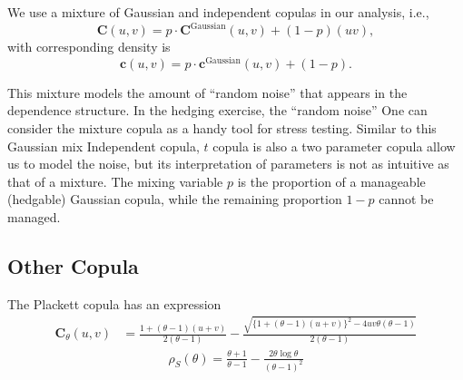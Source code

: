 We use a mixture of Gaussian and independent copulas in our analysis,
i.e., 
\begin{equation*}
  \bm{C}(u,v) = p\cdot \bm{C}^\text{Gaussian}(u,v) + (1-p)(uv),
\end{equation*}
with corresponding density is
\begin{equation*}
  \bm{c}(u,v) = p\cdot \bm{c}^\text{Gaussian}(u,v) + (1-p).
\end{equation*}

This mixture models the amount of ``random noise'' that appears in the
dependence structure. In the hedging exercise,  the
``random noise'' 
One can consider the mixture copula as a handy tool for stress testing.
Similar to this Gaussian mix Independent copula,
$t$ copula is also a two parameter copula allow us to model the noise,
but its interpretation of parameters is not as intuitive as that of a mixture.
The mixing variable $p$ is the proportion of a manageable (hedgable) Gaussian copula,
while the remaining proportion $1-p$ cannot be managed. 


\subsection{Other Copula}\label{subsec:other-copula}
The Plackett copula has an expression
\begin{align}
    \bm{C}_{\theta}(u,v) &= \frac{1+(\theta-1)(u+v)}{2(\theta-1)}
                         - \frac{\sqrt{\{
    1+(\theta-1)(u+v)\}^2 - 4uv\theta(\theta-1)}}{2(\theta-1)}
    \end{align}
\begin{align}
    \rho_S(\theta) = \frac{\theta+1}{\theta-1} - \frac{2\theta \log \theta}{(\theta-1)^2}
    \end{align}\medskip

